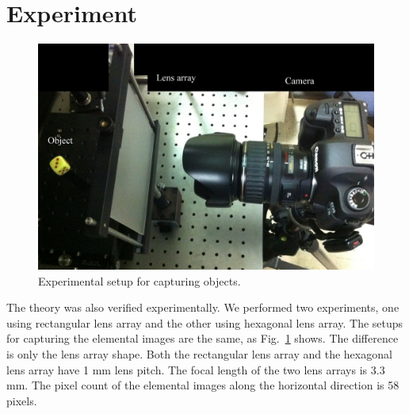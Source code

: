 \documentclass[10pt,letterpaper]{article}
\begin{document}
\section{Experiment}
\begin{figure}[htb]
\centering\includegraphics[width=.5\columnwidth]{fig_12}
\caption{Experimental setup for capturing objects.}
\label{fig_12}
\end{figure}
\noindent The theory was also verified experimentally. We performed two experiments, one using rectangular lens array and the other using hexagonal lens array. The setups for capturing the elemental images are the same, as Fig.~\ref{fig_12} shows. The difference is only the lens array shape.  Both the rectangular lens array and the hexagonal lens array have 1 mm lens pitch. The focal length of the two lens arrays is 3.3 mm. The pixel count of the elemental images along the horizontal direction is 58 pixels. 
\end{document}
